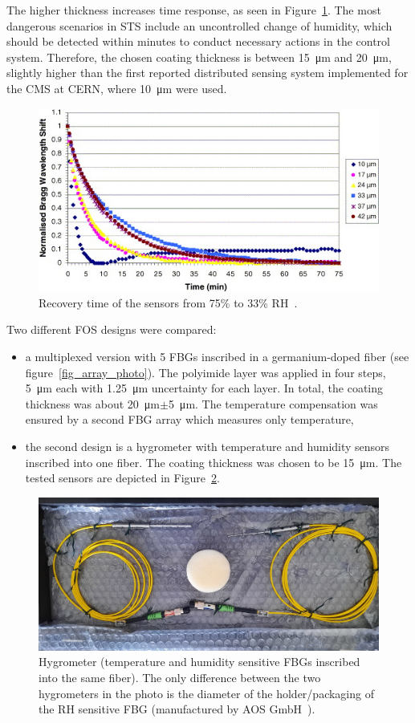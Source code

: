 The higher thickness increases time response, as seen in Figure~\ref{fig:yeo2}. The most dangerous scenarios in \gls{STS} include an uncontrolled change of humidity, which should be detected within minutes to conduct necessary actions in the control system. Therefore, the chosen coating thickness is between \SI{15}{\micro\metre} and \SI{20}{\micro\metre}, slightly higher than the first reported distributed sensing system implemented for the \gls{CMS} at \gls{CERN}, where \SI{10}{\micro\metre} were used. 
\begin{figure}[!h]
\centering
\includegraphics[width=0.80\columnwidth]{Chapter5/images/time_response_yeo.jpg}
\caption{Recovery time of the sensors from 75\% to 33\% RH~\cite{YEO_PI}.}
\label{fig:yeo2}
\end{figure}
\newpage
Two different \gls{FOS} designs were compared:
\begin{itemize}
    \item a multiplexed version with 5 \glspl{FBG} inscribed in a germanium-doped fiber (see figure~\ref{fig_array_photo}). The polyimide layer was applied in four steps, \SI{5}{\micro\metre} each with \SI{1.25}{\micro\metre} uncertainty for each layer. In total, the coating thickness was about \SI{20}{\micro\metre}$\pm$\SI{5}{\micro\metre}. The temperature compensation was ensured by a second \gls{FBG} array which measures only temperature,
    \item the second design is a hygrometer with temperature and humidity sensors inscribed into one fiber. The coating thickness was chosen to be \SI{15}{\micro\metre}. The tested sensors are depicted in Figure~\ref{fig_single_photo}.
\end{itemize}

\begin{figure}[!h]
\centering
\includegraphics[width=0.7\columnwidth]{Chapter5/images/single1.jpeg}
\caption{Hygrometer (temperature and humidity sensitive \glspl{FBG} inscribed into the same fiber). The only difference between the two hygrometers in the photo is the diameter of the holder/packaging of the \gls{RH} sensitive \gls{FBG} (manufactured by AOS GmbH~\cite{AOS}).}
\label{fig_single_photo}
\end{figure}

